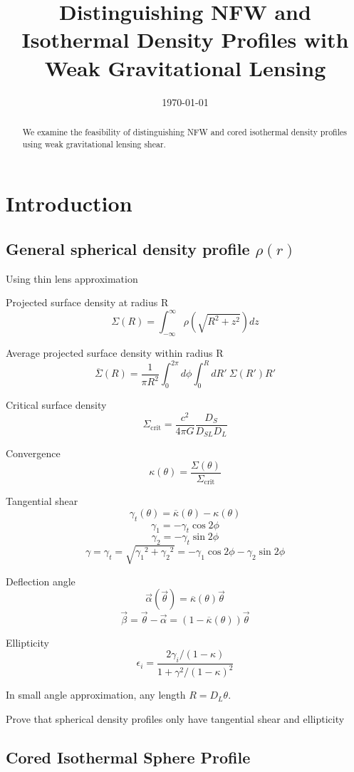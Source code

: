 \documentclass[]{article}
\begin{document}
\title{Distinguishing NFW and Isothermal Density Profiles with Weak Gravitational Lensing}
\author{}
\date{\today}
\maketitle

\begin{abstract}
We examine the feasibility of distinguishing NFW and cored isothermal density profiles using weak gravitational lensing shear.
\end{abstract}

\section{Introduction}

\subsection{General spherical density profile $\rho(r)$}
Using thin lens approximation

Projected surface density at radius R
\[\Sigma(R) = \int_{-\infty}^{\infty}{\rho(\sqrt{R^2 + z^2}) dz}\]

Average projected surface density within radius R
\[\overline{\Sigma}(R) = \frac{1}{\pi R^2} \int_0^{2\pi}{d\phi \int_0^{R}{dR'~\Sigma(R')R'}}\]

Critical surface density
\[\Sigma_\mathrm{crit} = \frac{c^2}{4\pi G} \frac{D_S}{D_{SL} D_L}\]

Convergence
\[\kappa(\theta) = \frac{\Sigma(\theta)}{\Sigma_\mathrm{crit}}\]

Tangential shear
\[\gamma_t(\theta) = \overline{\kappa}(\theta) - \kappa(\theta)\]
\[\gamma_1 = -\gamma_t \cos{2\phi}\]
\[\gamma_2 = -\gamma_t \sin{2\phi}\]
\[\gamma = \gamma_t = \sqrt{{\gamma_1}^2 + {\gamma_2}^2} = -\gamma_1 \cos{2\phi} -\gamma_2 \sin{2\phi}\]

Deflection angle
\[\vec{\alpha}(\vec{\theta}) = \overline{\kappa}(\theta)\vec{\theta}\]
\[\vec{\beta} = \vec{\theta} - \vec{\alpha} = (1 - \overline{\kappa}(\theta))\vec{\theta} \]

Ellipticity
\[\epsilon_i = \frac{2 \gamma_i/(1 - \kappa)}{1 + \gamma^2/(1 - \kappa)^2}\]

In small angle approximation, any length $R = D_L \theta$.

Prove that spherical density profiles only have tangential shear and ellipticity


\subsection{Cored Isothermal Sphere Profile}
\end{document}
